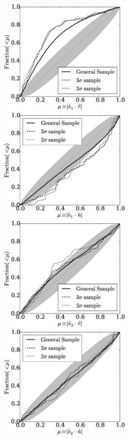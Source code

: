 \documentclass{iau}
\begin{document}
\begin{figure}[b]
\begin{center}
 \includegraphics[width=2.6in]{alignments_e1_r_all_environments.eps} 
 \includegraphics[width=2.6in]{alignments_e1_n_all_environments.eps} 
 \includegraphics[width=2.6in]{alignments_e2_r_all_environments.eps} 
 \includegraphics[width=2.6in]{alignments_e2_n_all_environments.eps} 

\end{center}
\end{figure}
\end{document}
